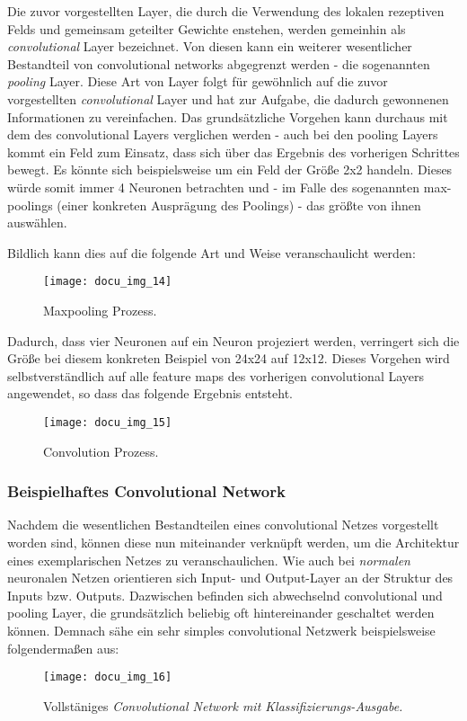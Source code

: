 Die zuvor vorgestellten Layer, die durch die Verwendung des lokalen rezeptiven Felds und gemeinsam geteilter Gewichte
enstehen, werden gemeinhin als \textit{convolutional} Layer bezeichnet. Von diesen kann ein weiterer wesentlicher Bestandteil
von convolutional networks abgegrenzt werden - die sogenannten \textit{pooling} Layer. Diese Art von Layer folgt für
gewöhnlich auf die zuvor vorgestellten \textit{convolutional} Layer und hat zur Aufgabe, die dadurch gewonnenen Informationen
zu vereinfachen.
Das grundsätzliche Vorgehen kann durchaus mit dem des convolutional Layers verglichen werden - auch bei den pooling
Layers kommt ein Feld zum Einsatz, dass sich über das Ergebnis des vorherigen Schrittes bewegt. Es könnte sich
beispielsweise um ein Feld der Größe 2x2 handeln. Dieses würde somit immer 4 Neuronen betrachten und - im Falle des
sogenannten max-poolings (einer konkreten Ausprägung des Poolings) - das größte von ihnen auswählen.

Bildlich kann dies auf die folgende Art und Weise veranschaulicht werden:

\begin{figure}[h]
    \centering
    \texttt{[image: docu\_img\_14]}
    \caption{Maxpooling Prozess.}
    \label{fig:max-pooling}
\end{figure}

Dadurch, dass vier Neuronen auf ein Neuron projeziert werden, verringert sich die Größe bei diesem konkreten Beispiel
von 24x24 auf 12x12. Dieses Vorgehen wird selbstverständlich auf alle feature maps des vorherigen convolutional Layers
angewendet, so dass das folgende Ergebnis entsteht.

\begin{figure}[h]
    \centering
    \texttt{[image: docu\_img\_15]}
    \caption{Convolution Prozess.}
    \label{fig:convolution-process}
\end{figure}

\subsubsection{Beispielhaftes Convolutional Network}

Nachdem die wesentlichen Bestandteilen eines convolutional Netzes vorgestellt worden sind, können diese nun miteinander
verknüpft werden, um die Architektur eines exemplarischen Netzes zu veranschaulichen. Wie auch bei \textit{normalen} neuronalen
Netzen orientieren sich Input- und Output-Layer an der Struktur des Inputs bzw. Outputs. Dazwischen befinden sich
abwechselnd convolutional und pooling Layer, die grundsätzlich beliebig oft hintereinander geschaltet werden können.
Demnach sähe ein sehr simples convolutional Netzwerk beispielsweise folgendermaßen aus:

\begin{figure}[h]
    \centering
    \texttt{[image: docu\_img\_16]}
    \caption{Vollstäniges \textit{Convolutional Network mit Klassifizierungs-Ausgabe.}}
    \label{fig:convoultional-newtork}
\end{figure}
